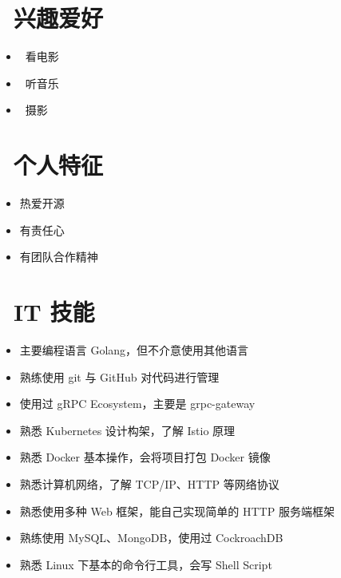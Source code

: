 \documentclass{resume}
\begin{document}
\section{\faSunO\ 兴趣爱好} \vspace{1mm}

\begin{itemize}[parsep=1ex]
	\item \faFilm\ {看电影}
	\item \faHeadphones\ {听音乐}
	\item \faCamera\ {摄影}
\end{itemize}

\section{\faUser\ 个人特征} \vspace{1mm}

\begin{itemize}[parsep=1ex]
	\item 热爱开源
	\item 有责任心
	\item 有团队合作精神
\end{itemize}

\section{\faCogs\ IT 技能} \vspace{1mm}

\begin{itemize}[parsep=1ex]
	\item 主要编程语言 Golang，但不介意使用其他语言
	\item 熟练使用 git 与 GitHub 对代码进行管理
	\item 使用过 gRPC Ecosystem，主要是 grpc-gateway
	\item 熟悉 Kubernetes 设计构架，了解 Istio 原理
	\item 熟悉 Docker 基本操作，会将项目打包 Docker 镜像
	\item 熟悉计算机网络，了解 TCP/IP、HTTP 等网络协议
	\item 熟悉使用多种 Web 框架，能自己实现简单的 HTTP 服务端框架
	\item 熟练使用 MySQL、MongoDB，使用过 CockroachDB
	\item 熟悉 Linux 下基本的命令行工具，会写 Shell Script
\end{itemize}
\end{document}
